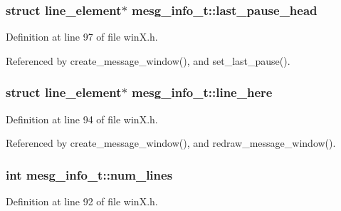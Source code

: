 \hypertarget{structmesg__info__t_af8c5f5bc77a707da17810c00e7dbb0a4}{
\subsubsection[{last\+\_\+pause\+\_\+head}]{\setlength{\rightskip}{0pt plus 5cm}struct {\bf line\+\_\+element}$\ast$ mesg\+\_\+info\+\_\+t\+::last\+\_\+pause\+\_\+head}}\label{structmesg__info__t_af8c5f5bc77a707da17810c00e7dbb0a4}


Definition at line 97 of file win\+X.\+h.



Referenced by create\+\_\+message\+\_\+window(), and set\+\_\+last\+\_\+pause().

\hypertarget{structmesg__info__t_afd9b6c059ba606c7181a04036e0a1d56}{
\subsubsection[{line\+\_\+here}]{\setlength{\rightskip}{0pt plus 5cm}struct {\bf line\+\_\+element}$\ast$ mesg\+\_\+info\+\_\+t\+::line\+\_\+here}}\label{structmesg__info__t_afd9b6c059ba606c7181a04036e0a1d56}


Definition at line 94 of file win\+X.\+h.



Referenced by create\+\_\+message\+\_\+window(), and redraw\+\_\+message\+\_\+window().

\hypertarget{structmesg__info__t_aba23aab1261a0730bd4fef133f902d81}{
\subsubsection[{num\+\_\+lines}]{\setlength{\rightskip}{0pt plus 5cm}int mesg\+\_\+info\+\_\+t\+::num\+\_\+lines}}\label{structmesg__info__t_aba23aab1261a0730bd4fef133f902d81}


Definition at line 92 of file win\+X.\+h.



